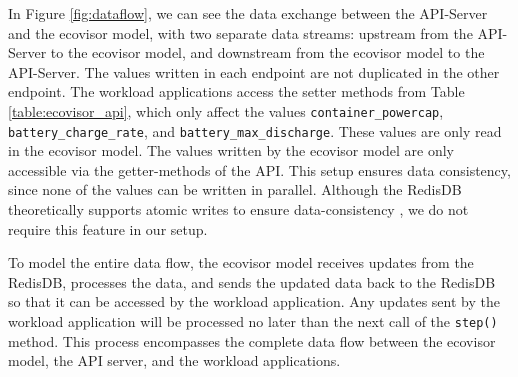 In Figure \ref{fig:dataflow}, we can see the data exchange between the
API-Server and the ecovisor model, with two separate data streams: upstream from
the API-Server to the ecovisor model, and downstream from the ecovisor model to
the API-Server. The values written in each endpoint are not duplicated in the
other endpoint. The workload applications access the setter methods from Table
\ref{table:ecovisor_api}, which only affect the values
\texttt{container\_powercap}, \texttt{battery\_charge\_rate}, and
\texttt{battery\_max\_discharge}. These values are only read in the ecovisor
model. The values written by the ecovisor model are only accessible via the
getter-methods of the API. This setup ensures data consistency, since none of
the values can be written in parallel. Although the RedisDB theoretically
supports atomic writes to ensure data-consistency \cite{redis}, we do not
require this feature in our setup.

To model the entire data flow, the ecovisor model receives updates from the
RedisDB, processes the data, and sends the updated data back to the RedisDB so
that it can be accessed by the workload application. Any updates sent by the
workload application will be processed no later than the next call of the
\texttt{step()} method. This process encompasses the complete data flow between
the ecovisor model, the API server, and the workload applications.
